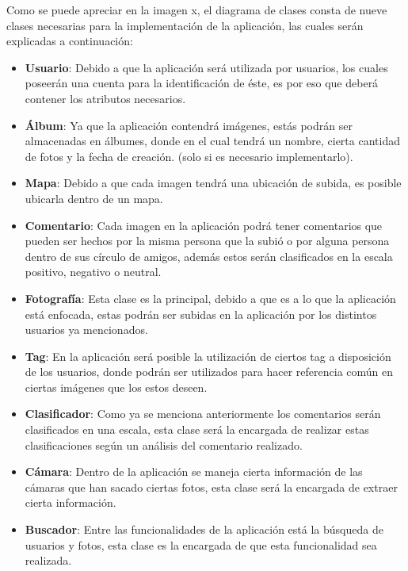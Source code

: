 \documentclass{memoria}
\begin{document}

Como se puede apreciar en la imagen x, el diagrama de clases consta de nueve clases necesarias para la implementación de la aplicación, las cuales serán explicadas a continuación:

\begin{itemize}
    \item \textbf{Usuario}: Debido a que la aplicación será utilizada por usuarios, los cuales poseerán una cuenta para la identificación de éste, es por eso que deberá contener los atributos necesarios. 
    \item \textbf{Álbum}: Ya que la aplicación contendrá imágenes, estás podrán ser almacenadas en álbumes, donde en el cual tendrá un nombre, cierta cantidad de fotos y la fecha de creación. (solo si es necesario implementarlo).
    \item \textbf{Mapa}: Debido a que cada imagen tendrá una ubicación de subida, es posible ubicarla dentro de un mapa.
    \item \textbf{Comentario}: Cada imagen en la aplicación podrá tener comentarios que pueden ser hechos por la misma persona que la subió o por alguna persona dentro de sus círculo de amigos, además estos serán clasificados en la escala positivo, negativo o neutral.
    \item \textbf{Fotografía}: Esta clase es la principal, debido a que es a lo que la aplicación está enfocada, estas podrán ser subidas en la aplicación por los distintos usuarios ya mencionados.
    \item \textbf{Tag}: En la aplicación será posible la utilización de ciertos tag a disposición de los usuarios, donde podrán ser utilizados para hacer referencia común en ciertas imágenes que los estos deseen.
    \item \textbf{Clasificador}: Como ya se menciona anteriormente los comentarios serán clasificados en una escala, esta clase será la encargada de realizar estas clasificaciones según un análisis del comentario realizado.
    \item \textbf{Cámara}: Dentro de la aplicación se maneja cierta información de las cámaras que han sacado ciertas fotos, esta clase será la encargada de extraer cierta información.
    \item \textbf{Buscador}: Entre las funcionalidades de la aplicación está la búsqueda de usuarios y fotos, esta clase es la encargada de que esta funcionalidad sea realizada.   
\end{itemize}
\end{document}

